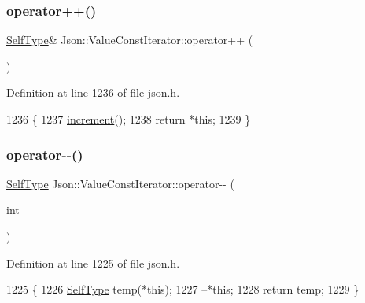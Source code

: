 \subsubsection{\texorpdfstring{operator++()}{operator++()}\hspace{0.1cm}{\footnotesize\ttfamily [2/2]}}
{\footnotesize\ttfamily \hyperlink{class_json_1_1_value_iterator_base_a9d2a940d03ea06d20d972f41a89149ee}{Self\+Type}\& Json\+::\+Value\+Const\+Iterator\+::operator++ (\begin{DoxyParamCaption}{ }\end{DoxyParamCaption})\hspace{0.3cm}{\ttfamily [inline]}}



Definition at line 1236 of file json.\+h.


\begin{DoxyCode}
1236                          \{
1237     \hyperlink{class_json_1_1_value_iterator_base_afe58f9534e1fd2033419fd9fe244551e}{increment}();
1238     \textcolor{keywordflow}{return} *\textcolor{keyword}{this};
1239   \}
\end{DoxyCode}
\mbox{\label{class_json_1_1_value_const_iterator_a94935961e9331c6f7b907b05ec8df75e}} 
\subsubsection{\texorpdfstring{operator-\/-\/()}{operator--()}\hspace{0.1cm}{\footnotesize\ttfamily [1/2]}}
{\footnotesize\ttfamily \hyperlink{class_json_1_1_value_iterator_base_a9d2a940d03ea06d20d972f41a89149ee}{Self\+Type} Json\+::\+Value\+Const\+Iterator\+::operator-\/-\/ (\begin{DoxyParamCaption}\item[{int}]{ }\end{DoxyParamCaption})\hspace{0.3cm}{\ttfamily [inline]}}



Definition at line 1225 of file json.\+h.


\begin{DoxyCode}
1225                            \{
1226     \hyperlink{class_json_1_1_value_const_iterator_a0c2e33e7eb5a80dd8709fb28ece83933}{SelfType} temp(*\textcolor{keyword}{this});
1227     --*\textcolor{keyword}{this};
1228     \textcolor{keywordflow}{return} temp;
1229   \}
\end{DoxyCode}
\mbox{\label{class_json_1_1_value_const_iterator_a31415e44e44e56fb2bfda7e8bb784646}} 
